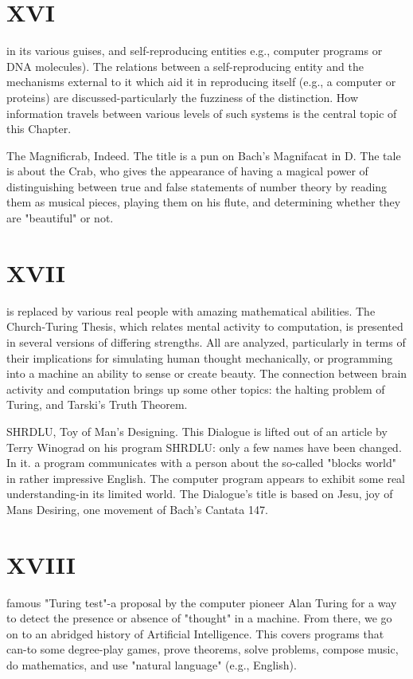 \chapter {XVI}
in its various guises, and self-reproducing entities e.g., computer programs or DNA molecules). The relations between a self-reproducing entity and the mechanisms external to it which aid it in reproducing itself (e.g., a computer or proteins) are discussed-particularly the fuzziness of the distinction. How information travels between various levels of such systems is the central topic of this Chapter. 

The Magnificrab, Indeed. The title is a pun on Bach's Magnifacat in D. The tale is about the Crab, who gives the appearance of having a magical power of distinguishing between true and false statements of number theory by reading them as musical pieces, playing them on his flute, and determining whether they are "beautiful" or not. 


\chapter {XVII}
is replaced by various real people with amazing mathematical abilities. The Church-Turing Thesis, which relates mental activity to computation, is presented in several versions of differing strengths. All are analyzed, particularly in terms of their implications for simulating human thought mechanically, or programming into a machine an ability to sense or create beauty. The connection between brain activity and computation brings up some other topics: the halting problem of Turing, and Tarski's Truth Theorem. 

SHRDLU, Toy of Man's Designing. This Dialogue is lifted out of an article by Terry Winograd on his program SHRDLU: only a few names have been changed. In it. a program communicates with a person about the so-called "blocks world" in rather impressive English. The computer program appears to exhibit some real understanding-in its limited world. The Dialogue's title is based on Jesu, joy of Mans Desiring, one movement of Bach's Cantata 147. 


\chapter {XVIII}
famous "Turing test"-a proposal by the computer pioneer Alan Turing for a way to detect the presence or absence of "thought" in a machine. From there, we go on to an abridged history of Artificial Intelligence. This covers programs that can-to some degree-play games, prove theorems, solve problems, compose music, do mathematics, and use "natural language" (e.g., English). 







